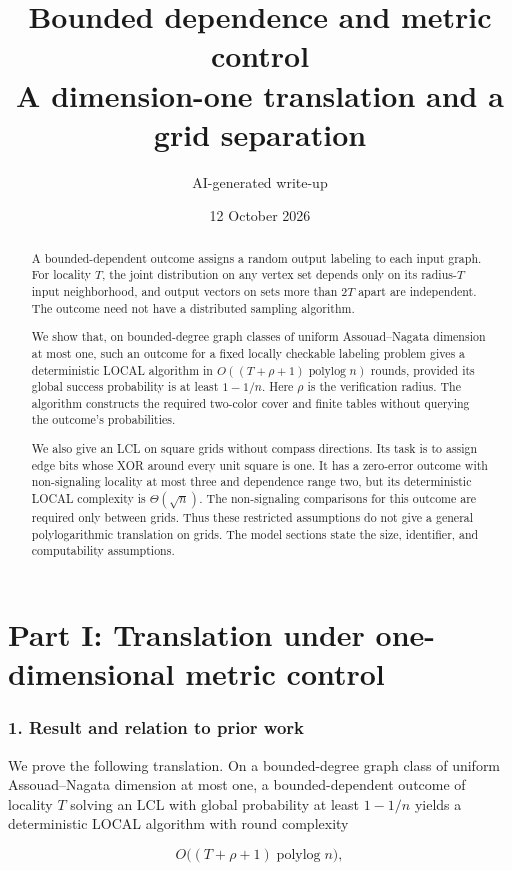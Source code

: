 \documentclass[11pt,a4paper]{article}
\title{Bounded dependence and metric control\\[0.4em]\large A dimension-one translation and a grid separation}
\author{AI-generated write-up}
\date{12 October 2026}
\begin{document}
\maketitle
\begin{abstract}
A bounded-dependent outcome assigns a random output labeling to each input graph.
For locality $T$, the joint distribution on any vertex set depends only on its radius-$T$ input neighborhood, and output vectors on sets more than $2T$ apart are independent.
The outcome need not have a distributed sampling algorithm.

We show that, on bounded-degree graph classes of uniform Assouad--Nagata dimension at most one, such an outcome for a fixed locally checkable labeling problem gives a deterministic LOCAL algorithm in $O((T+\rho+1)\operatorname{polylog}n)$ rounds, provided its global success probability is at least $1-1/n$.
Here $\rho$ is the verification radius.
The algorithm constructs the required two-color cover and finite tables without querying the outcome's probabilities.

We also give an LCL on square grids without compass directions.
Its task is to assign edge bits whose XOR around every unit square is one.
It has a zero-error outcome with non-signaling locality at most three and dependence range two, but its deterministic LOCAL complexity is $\Theta(\sqrt n)$.
The non-signaling comparisons for this outcome are required only between grids.
Thus these restricted assumptions do not give a general polylogarithmic translation on grids.
The model sections state the size, identifier, and computability assumptions.
\end{abstract}
\clearpage
\tableofcontents
\clearpage
\part{Part I: Translation under one-dimensional metric control}
\section{1. Result and relation to prior work}\label{result-and-relation-to-prior-work}

We prove the following translation.
On a bounded-degree graph class of uniform Assouad--Nagata dimension at most one, a bounded-dependent outcome of locality \(T\) solving an LCL with global probability at least \(1-1/n\) yields a deterministic LOCAL algorithm with round complexity

\[ O\bigl((T+\rho+1)\operatorname{polylog} n\bigr), \]
\end{document}
